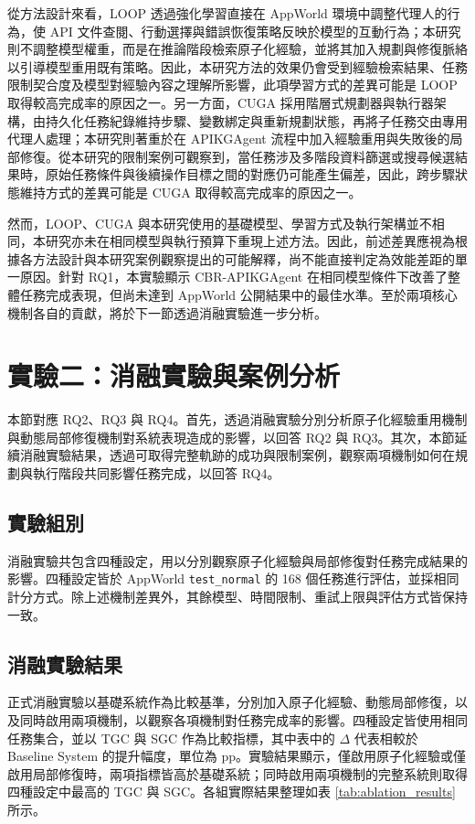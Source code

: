 \begin{ZhChapter}
從方法設計來看，LOOP 透過強化學習直接在 AppWorld 環境中調整代理人的行為，使 API 文件查閱、行動選擇與錯誤恢復策略反映於模型的互動行為；本研究則不調整模型權重，而是在推論階段檢索原子化經驗，並將其加入規劃與修復脈絡以引導模型重用既有策略。因此，本研究方法的效果仍會受到經驗檢索結果、任務限制契合度及模型對經驗內容之理解所影響，此項學習方式的差異可能是 LOOP 取得較高完成率的原因之一。另一方面，CUGA 採用階層式規劃器與執行器架構，由持久化任務紀錄維持步驟、變數綁定與重新規劃狀態，再將子任務交由專用代理人處理；本研究則著重於在 APIKGAgent 流程中加入經驗重用與失敗後的局部修復。從本研究的限制案例可觀察到，當任務涉及多階段資料篩選或搜尋候選結果時，原始任務條件與後續操作目標之間的對應仍可能產生偏差，因此，跨步驟狀態維持方式的差異可能是 CUGA 取得較高完成率的原因之一。

然而，LOOP、CUGA 與本研究使用的基礎模型、學習方式及執行架構並不相同，本研究亦未在相同模型與執行預算下重現上述方法。因此，前述差異應視為根據各方法設計與本研究案例觀察提出的可能解釋，尚不能直接判定為效能差距的單一原因。針對 RQ1，本實驗顯示 CBR-APIKGAgent 在相同模型條件下改善了整體任務完成表現，但尚未達到 AppWorld 公開結果中的最佳水準。至於兩項核心機制各自的貢獻，將於下一節透過消融實驗進一步分析。

\section{實驗二：消融實驗與案例分析}

本節對應 RQ2、RQ3 與 RQ4。首先，透過消融實驗分別分析原子化經驗重用機制與動態局部修復機制對系統表現造成的影響，以回答 RQ2 與 RQ3。其次，本節延續消融實驗結果，透過可取得完整軌跡的成功與限制案例，觀察兩項機制如何在規劃與執行階段共同影響任務完成，以回答 RQ4。

\subsection{實驗組別}

消融實驗共包含四種設定，用以分別觀察原子化經驗與局部修復對任務完成結果的影響。四種設定皆於 AppWorld \texttt{test\_normal} 的 168 個任務進行評估，並採相同計分方式。除上述機制差異外，其餘模型、時間限制、重試上限與評估方式皆保持一致。

\subsection{消融實驗結果}

正式消融實驗以基礎系統作為比較基準，分別加入原子化經驗、動態局部修復，以及同時啟用兩項機制，以觀察各項機制對任務完成率的影響。四種設定皆使用相同任務集合，並以 TGC 與 SGC 作為比較指標，其中表中的 $\Delta$ 代表相較於 Baseline System 的提升幅度，單位為 pp。實驗結果顯示，僅啟用原子化經驗或僅啟用局部修復時，兩項指標皆高於基礎系統；同時啟用兩項機制的完整系統則取得四種設定中最高的 TGC 與 SGC。各組實際結果整理如表 \ref{tab:ablation_results} 所示。


\end{ZhChapter}

